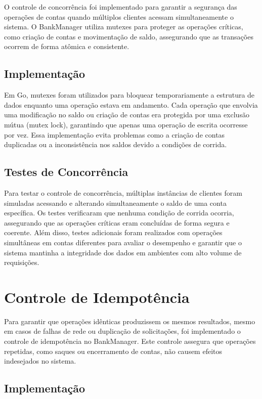 \documentclass[a4paper,10pt]{article}
\begin{document}
\begin{multicols}{2}
O controle de concorrência foi implementado para garantir a segurança das operações de contas quando múltiplos clientes acessam simultaneamente o sistema. O BankManager utiliza mutexes para proteger as operações críticas, como criação de contas e movimentação de saldo, assegurando que as transações ocorrem de forma atômica e consistente.

\subsection{Implementação}

Em Go, mutexes foram utilizados para bloquear temporariamente a estrutura de dados enquanto uma operação estava em andamento. Cada operação que envolvia uma modificação no saldo ou criação de contas era protegida por uma exclusão mútua (mutex lock), garantindo que apenas uma operação de escrita ocorresse por vez. Essa implementação evita problemas como a criação de contas duplicadas ou a inconsistência nos saldos devido a condições de corrida.

\subsection{Testes de Concorrência}

Para testar o controle de concorrência, múltiplas instâncias de clientes foram simuladas acessando e alterando simultaneamente o saldo de uma conta específica. Os testes verificaram que nenhuma condição de corrida ocorria, assegurando que as operações críticas eram concluídas de forma segura e coerente. Além disso, testes adicionais foram realizados com operações simultâneas em contas diferentes para avaliar o desempenho e garantir que o sistema mantinha a integridade dos dados em ambientes com alto volume de requisições.

\section{Controle de Idempotência}

Para garantir que operações idênticas produzissem os mesmos resultados, mesmo em casos de falhas de rede ou duplicação de solicitações, foi implementado o controle de idempotência no BankManager. Este controle assegura que operações repetidas, como saques ou encerramento de contas, não causem efeitos indesejados no sistema.

\subsection{Implementação}


\end{multicols}
\end{document}
